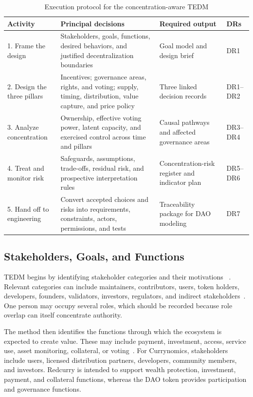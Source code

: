 \documentclass[referee,sn-basic]{sn-jnl}
\begin{document}
\begin{table}[t]
\caption{Execution protocol for the concentration-aware TEDM}
\label{tab:tedm-execution}
\centering
\small
\begin{tabularx}{\linewidth}{@{}p{.19\linewidth}X X p{.13\linewidth}@{}}
\toprule
Activity & Principal decisions & Required output & DRs \\
\midrule
1. Frame the design & Stakeholders, goals, functions, desired behaviors, and
justified decentralization boundaries & Goal model and design brief & DR1 \\
2. Design the three pillars & Incentives; governance areas, rights, and voting;
supply, timing, distribution, value capture, and price policy & Three linked
decision records & DR1--DR2 \\
3. Analyze concentration & Ownership, effective voting power, latent capacity,
and exercised control across time and pillars & Causal pathways and affected
governance areas & DR3--DR4 \\
4. Treat and monitor risk & Safeguards, assumptions, trade-offs, residual risk,
and prospective interpretation rules & Concentration-risk register and
indicator plan & DR5--DR6 \\
5. Hand off to engineering & Convert accepted choices and risks into
requirements, constraints, actors, permissions, and tests & Traceability
package for DAO modeling & DR7 \\
\bottomrule
\end{tabularx}
\end{table}

\subsection{Stakeholders, Goals, and Functions}\label{subsec:goals-functions}

TEDM begins by identifying stakeholder categories and their motivations
~\cite{Khamisa2021}. Relevant categories can include maintainers, contributors,
users, token holders, developers, founders, validators, investors, regulators,
and indirect stakeholders~\cite{Davidson2021,Allen2020,Voshmgir2020,liu2022}.
One person may occupy several roles, which should be recorded because role
overlap can itself concentrate authority.

The method then identifies the functions through which the ecosystem is
expected to create value. These may include payment, investment, access,
service use, asset monitoring, collateral, or voting~\cite{Schubert2021,
Sockin2020}. For Currynomics, stakeholders include users, licensed distribution
partners, developers, community members, and investors. Redcurry is intended to
support wealth protection, investment, payment, and collateral functions,
whereas the DAO token provides participation and governance functions.
\end{document}
